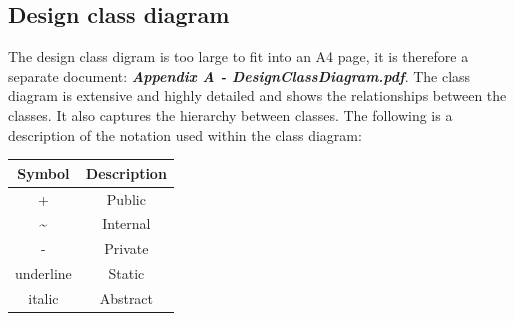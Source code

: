 \documentclass[11pt,a4paper]{article}
\begin{document}
\subsection{Design class diagram}
The design class digram is too large to fit into an A4 page, it is therefore a separate document: \textit{\textbf{Appendix A - DesignClassDiagram.pdf}}. The class diagram is extensive and highly detailed and shows the relationships between the classes. It also captures the hierarchy between classes. The following is a description of the notation used within the class diagram:
\begin{center}
    \begin{tabular}{|c|c|}
        \hline
        \textbf{Symbol} & \textbf{Description} \\
        \hline
        + & Public \\
        \textasciitilde  & Internal \\
        - & Private \\
        underline & Static \\
        italic & Abstract \\
        \hline
    \end{tabular}    
\end{center}
\end{document}
